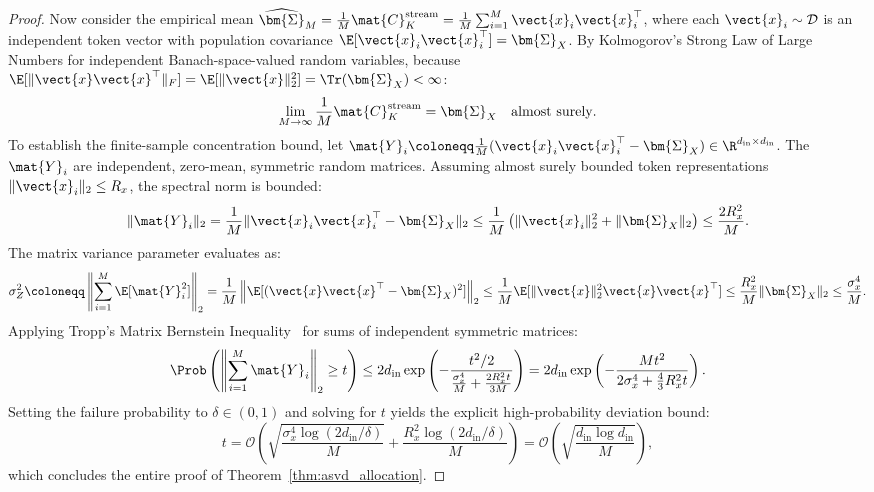 \begin{proof}
Now consider the empirical mean $\widehat{\bm{\Sigma}}_M = \frac{1}{M} \mat{C}_K^{\text{stream}} = \frac{1}{M} \sum_{i=1}^M \vect{x}_i \vect{x}_i^\top$, where each $\vect{x}_i \sim \mathcal{D}$ is an independent token vector with population covariance $\E[\vect{x}_i \vect{x}_i^\top] = \bm{\Sigma}_X$.
By Kolmogorov's Strong Law of Large Numbers for independent Banach-space-valued random variables, because $\E[\|\vect{x} \vect{x}^\top\|_F] = \E[\|\vect{x}\|_2^2] = \Tr(\bm{\Sigma}_X) < \infty$:
\begin{equation}
\lim_{M \to \infty} \frac{1}{M} \mat{C}_K^{\text{stream}} = \bm{\Sigma}_X \quad \text{almost surely}.
\end{equation}
To establish the finite-sample concentration bound, let $\mat{Y}_i \coloneqq \frac{1}{M} (\vect{x}_i \vect{x}_i^\top - \bm{\Sigma}_X) \in \R^{d_{\text{in}} \times d_{\text{in}}}$.
The $\mat{Y}_i$ are independent, zero-mean, symmetric random matrices.
Assuming almost surely bounded token representations $\|\vect{x}_i\|_2 \le R_x$, the spectral norm is bounded:
\begin{equation}
\|\mat{Y}_i\|_2 = \frac{1}{M} \|\vect{x}_i \vect{x}_i^\top - \bm{\Sigma}_X\|_2 \le \frac{1}{M} \left( \|\vect{x}_i\|_2^2 + \|\bm{\Sigma}_X\|_2 \right) \le \frac{2 R_x^2}{M}.
\end{equation}
The matrix variance parameter evaluates as:
\begin{equation}
\sigma_Z^2 \coloneqq \left\| \sum_{i=1}^M \E[\mat{Y}_i^2] \right\|_2 = \frac{1}{M} \left\| \E[(\vect{x} \vect{x}^\top - \bm{\Sigma}_X)^2] \right\|_2 \le \frac{1}{M} \E[\|\vect{x}\|_2^2 \vect{x} \vect{x}^\top] \le \frac{R_x^2}{M} \|\bm{\Sigma}_X\|_2 \le \frac{\sigma_x^4}{M}.
\end{equation}
Applying Tropp's Matrix Bernstein Inequality~\cite{tropp2012user} for sums of independent symmetric matrices:
\begin{equation}
\Prob\left( \left\| \sum_{i=1}^M \mat{Y}_i \right\|_2 \ge t \right) \le 2 d_{\text{in}} \exp\left( -\frac{t^2 / 2}{\frac{\sigma_x^4}{M} + \frac{2 R_x^2 t}{3 M}} \right) = 2 d_{\text{in}} \exp\left( -\frac{M t^2}{2 \sigma_x^4 + \frac{4}{3} R_x^2 t} \right).
\end{equation}
Setting the failure probability to $\delta \in (0, 1)$ and solving for $t$ yields the explicit high-probability deviation bound:
\begin{equation}
t = \mathcal{O}\left( \sqrt{\frac{\sigma_x^4 \log(2 d_{\text{in}} / \delta)}{M}} + \frac{R_x^2 \log(2 d_{\text{in}} / \delta)}{M} \right) = \mathcal{O}\left( \sqrt{\frac{d_{\text{in}} \log d_{\text{in}}}{M}} \right),
\end{equation}
which concludes the entire proof of Theorem~\ref{thm:asvd_allocation}.
\end{proof}

